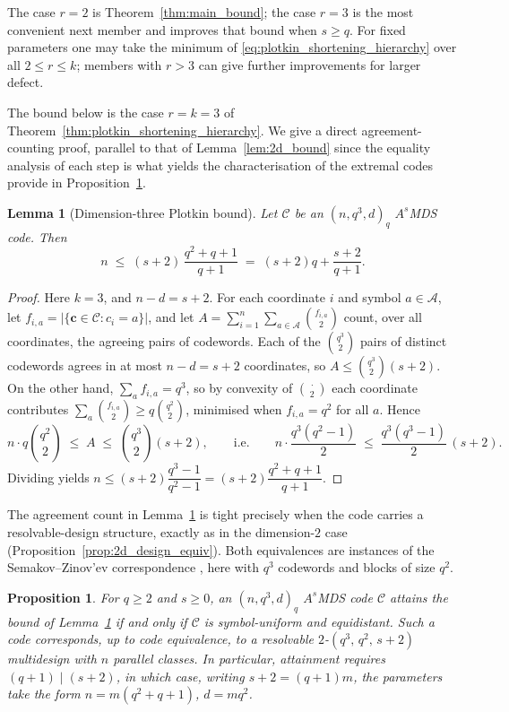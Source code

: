\documentclass[12pt, letterpaper]{article}
\theoremstyle{plain}
\newtheorem{proposition}[theorem]{Proposition}
\newtheorem{lemma}[theorem]{Lemma}
\theoremstyle{definition}
\newcommand{\A}{{\mathcal{A}}}
\newcommand{\mc}[1]{\mathcal{#1}}
\begin{document}
	The case $r=2$ is Theorem~\ref{thm:main_bound}; the case $r=3$ is the most convenient next member and  improves that bound when $s\ge q$. For fixed parameters one may take the minimum of \eqref{eq:plotkin_shortening_hierarchy} over all $2\le r\le k$; members with $r>3$ can give further improvements for larger defect.
	
	The bound below is the case $r=k=3$ of Theorem~\ref{thm:plotkin_shortening_hierarchy}. We  give a direct agreement-counting proof, parallel to that of Lemma~\ref{lem:2d_bound} since the equality analysis of each step is what yields the characterisation of the extremal codes provide in Proposition~\ref{prop:dim3_design_equiv}.

	\begin{lemma}[Dimension-three Plotkin bound]\label{lem:dim3_plotkin_sharp}
		Let $\mc{C}$ be an $(n, q^3, d)_q$ $A^s$MDS code. Then
		\[
		n \;\le\; (s+2)\,\frac{q^2+q+1}{q+1} \;=\; (s+2)q+ \frac{s+2}{q+1}.
		\]
	\end{lemma}

	\begin{proof}
		Here $k = 3$, and $n-d = s+2$. For each coordinate $i$ and symbol $a\in\A$, let $f_{i,a} = |\{\mathbf{c}\in\mc{C} : c_i = a\}|$, and let $A = \sum_{i=1}^{n}\sum_{a\in\A}\binom{f_{i,a}}{2}$ count, over all coordinates, the agreeing pairs of codewords. Each of the $\binom{q^3}{2}$ pairs of distinct codewords agrees in at most $n-d = s+2$ coordinates, so $A \le \binom{q^3}{2}(s+2)$. On the other hand, $\sum_a f_{i,a} = q^3$, so by convexity of $\binom{\cdot}{2}$ each coordinate contributes $\sum_a \binom{f_{i,a}}{2}\ge q\binom{q^2}{2}$, minimised when $f_{i,a}=q^2$ for all $a$. Hence
		\[
		n\cdot q\binom{q^2}{2} \;\le\; A \;\le\; \binom{q^3}{2}(s+2),
		\qquad\text{i.e.}\qquad
		n\cdot\frac{q^3(q^2-1)}{2} \;\le\; \frac{q^3(q^3-1)}{2}\,(s+2).
		\]
		Dividing yields $n \le (s+2)\dfrac{q^3-1}{q^2-1} = (s+2)\dfrac{q^2+q+1}{q+1}$.
	\end{proof}
	
		The agreement count in Lemma~\ref{lem:dim3_plotkin_sharp} is tight precisely when the code carries a resolvable-design structure, exactly as in the dimension-$2$ case (Proposition~\ref{prop:2d_design_equiv}). Both equivalences are instances of the Semakov--Zinov'ev correspondence \cite{SemakovZinoviev1968}, here with $q^3$ codewords and blocks of size $q^2$.
	
	\begin{proposition}\label{prop:dim3_design_equiv}
		For $q \ge 2$ and $s \ge 0$, an $(n, q^3, d)_q$ $A^s$MDS code $\mathcal{C}$ attains the bound of Lemma~\ref{lem:dim3_plotkin_sharp} if and only if $\mathcal{C}$ is symbol-uniform and equidistant. Such a code corresponds, up to code equivalence, to a resolvable $2$-$(q^3,\,q^2,\,s+2)$ multidesign with $n$ parallel classes. In particular, attainment requires $(q+1) \mid (s+2)$, in which case, writing $s+2 = (q+1)m$, the parameters take the form $n = m(q^2+q+1)$, $d = mq^2$.
	\end{proposition}
	
\end{document}
